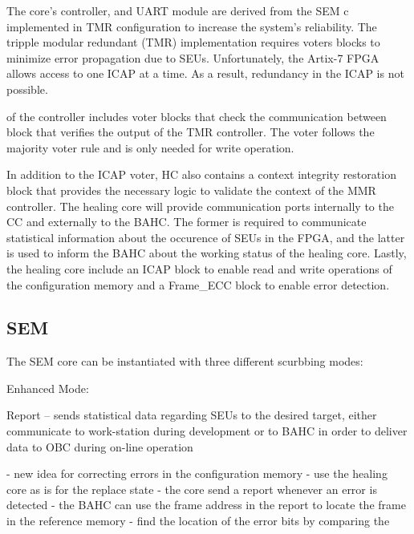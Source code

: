  The core's controller, and UART module are derived from the SEM c implemented in TMR configuration to increase the system's reliability. The tripple modular redundant (TMR) implementation requires voters blocks to minimize error propagation due to SEUs. Unfortunately, the Artix-7 FPGA allows access to one ICAP at a time. As a result, redundancy in the ICAP is not possible. 

 of the controller includes voter blocks that check the communication between  block that verifies the output of the TMR controller. The voter follows the majority voter rule and is only needed for write operation. 


In addition to the ICAP voter, HC also contains a context integrity restoration block that provides the necessary logic to validate the context of the MMR controller. The healing core will provide communication ports internally to the CC and externally to the BAHC. The former is required to communicate statistical information about the occurence of SEUs in the FPGA, and the latter is used to inform the BAHC about the working status of the healing core. Lastly, the healing core include an ICAP block to enable read and write operations of the configuration memory and a Frame\_ECC block to enable error detection.

\subsection{SEM}

 The SEM core can be instantiated with three different scurbbing modes:
\begin{itemized}
	\item Enhanced Mode:
\end{itemized} 

Report -- sends statistical data regarding SEUs to the desired target, either communicate to work-station during development or to BAHC in order to deliver data to OBC during on-line operation

- new idea for correcting errors in the configuration memory
    - use the healing core as is for the replace state
    - the core send a report whenever an error is detected
    - the BAHC can use the frame address in the report to locate the frame in the reference memory
    - find the location of the error bits by comparing the 

